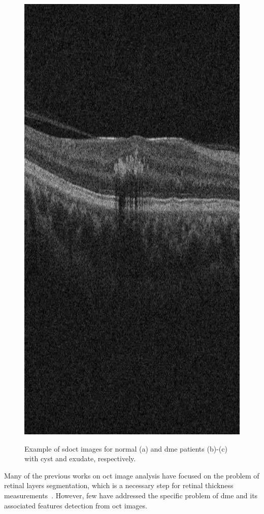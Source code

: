 \begin{figure}
\begin{center}
{\includegraphics[scale=0.15]{dme_exudate}}

\end{center}
\caption{ Example of \ac{sdoct} images for normal (a) and \ac{dme} patients (b)-(c) with cyst and exudate, respectively.}
\label{fig:dme-normal}
\end{figure}
\begin{changebar}
Many of the previous works on \ac{oct} image analysis have focused on the problem of retinal layers segmentation, which is a necessary step for retinal
thickness measurements~\cite{Chiu2010,Kafieh2013}.
However, few have addressed the specific problem of \ac{dme} and its associated features detection from \ac{oct} images.
\end{changebar}

